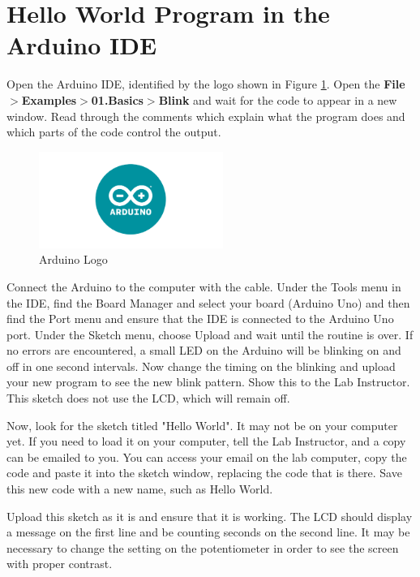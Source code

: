 \documentclass[]{article}
\begin{document}
\section{Hello World Program in the Arduino IDE}

Open the Arduino IDE, identified by the logo shown in Figure \ref{arduino}.  Open the \textbf{ File$>$Examples$>$01.Basics$>$Blink} and wait for the code to appear in a new window.  Read through the comments which explain what the program does and which parts of the code control the output.


\begin{figure}[h]
	\centering
	\includegraphics[width=6cm]{pics/arduino-ide.png}
	\caption{Arduino Logo}
	\label{arduino}
\end{figure}

Connect the Arduino to the computer with the cable.  Under the Tools menu in the IDE, find the Board Manager and select your board (Arduino Uno) and then find the Port menu and ensure that the IDE is connected to the Arduino Uno port.  Under the Sketch menu, choose Upload and wait until the routine is over.  If no errors are encountered, a small LED on the Arduino will be blinking on and off in one second intervals.  Now change the timing on the blinking and upload your new program to see the new blink pattern.  Show this to the Lab Instructor.  This sketch does not use the LCD, which will remain off.

Now, look for the sketch titled "Hello World".  It may not be on your computer yet.  If you need to load it on your computer, tell the Lab Instructor, and a copy can be emailed to you.  You can access your email on the lab computer, copy the code and paste it into the sketch window, replacing the code that is there.  Save this new code with a new name, such as Hello World.

Upload this sketch as it is and ensure that it is working.  The LCD should display a message on the first line and be counting seconds on the second line.  It may be necessary to change the setting on the potentiometer in order to see the screen with proper contrast.  
\end{document}
